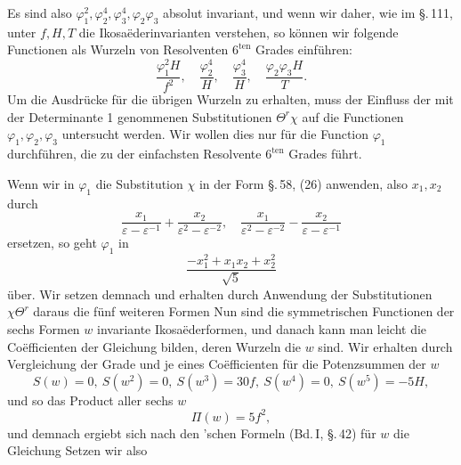 Es sind also $\varphi_1^2, \varphi_2^4, \varphi_3^4, \varphi_2\varphi_3$ absolut invariant, und wenn wir daher, wie im \S.\,111, unter $f, H, T$ die Ikosa\"ederinvarianten verstehen, so k\"onnen wir folgende Functionen als Wurzeln von Resolventen $6^{\mathrm{ten}}$ Grades einf\"uhren:
\[
\frac{\varphi_1^2H}{f^2},\quad \frac{\varphi_2^4}{H},\quad \frac{\varphi_3^4}{H},\quad \frac{\varphi_2\varphi_3H}{T}.
\]
Um die Ausdr\"ucke f\"ur die \"ubrigen Wurzeln zu erhalten, muss der Einfluss der mit der Determinante 1 genommenen Substitutionen $\Theta^r\chi$ auf die Functionen $\varphi_1, \varphi_2, \varphi_3$ untersucht werden. Wir wollen dies nur f\"ur die Function $\varphi_1$ durchf\"uhren, die zu der einfachsten Resolvente $6^{\mathrm{ten}}$ Grades f\"uhrt.

Wenn wir in $\varphi_1$ die Substitution $\chi$ in der Form \S.\,58, (26) anwenden, also $x_1, x_2$ durch
\[
\frac{x_1}{\varepsilon-\varepsilon^{-1}}+\frac{x_2}{\varepsilon^2-\varepsilon^{-2}},\quad \frac{x_1}{\varepsilon^2-\varepsilon^{-2}}-\frac{x_2}{\varepsilon-\varepsilon^{-1}}
\]
ersetzen, so geht $\varphi_1$ in
\[
\frac{-x_1^2+x_1x_2+x_2^2}{\sqrt5}
\]
\"uber. Wir setzen demnach
und erhalten durch Anwendung der Substitutionen $\chi\Theta^r$ daraus die f\"unf weiteren Formen
Nun sind die symmetrischen Functionen der sechs Formen $w$ invariante Ikosa\"ederformen, und danach kann man leicht die Co\"efficienten der Gleichung bilden, deren Wurzeln die $w$ sind. Wir erhalten durch Vergleichung der Grade und je eines Co\"efficienten f\"ur die Potenzsummen der $w$
\[
S(w)=0,\ S(w^2)=0,\ S(w^3)=30f,\ S(w^4)=0,\ S(w^5)=-5H,
\]
und so das Product aller sechs $w$
\[
\Pi(w)=5f^2,
\]
und demnach ergiebt sich nach den 'schen Formeln (Bd.\,I, \S.\,42) f\"ur $w$ die Gleichung
Setzen wir also
